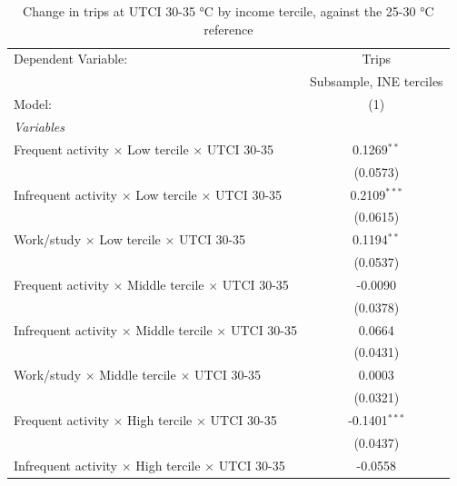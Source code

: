 
\begin{table}[htbp]
   \caption{\label{table_model_d_30-35} Change in trips at UTCI 30-35 °C by income tercile, against the 25-30 °C reference}
   \centering
   \small
   \begin{tabular}{lc}
      \tabularnewline \midrule \midrule
      Dependent Variable:                                               & Trips\\  
                                                                        & Subsample, INE terciles \\   
      Model:                                                            & (1)\\  
      \midrule
      \emph{Variables}\\
      Frequent activity $\times$ Low tercile $\times$ UTCI 30-35        & 0.1269$^{**}$\\   
                                                                        & (0.0573)\\   
      Infrequent activity $\times$ Low tercile $\times$ UTCI 30-35      & 0.2109$^{***}$\\   
                                                                        & (0.0615)\\   
      Work/study $\times$ Low tercile $\times$ UTCI 30-35               & 0.1194$^{**}$\\   
                                                                        & (0.0537)\\   
      Frequent activity $\times$ Middle tercile $\times$ UTCI 30-35     & -0.0090\\   
                                                                        & (0.0378)\\   
      Infrequent activity $\times$ Middle tercile $\times$ UTCI 30-35   & 0.0664\\   
                                                                        & (0.0431)\\   
      Work/study $\times$ Middle tercile $\times$ UTCI 30-35            & 0.0003\\   
                                                                        & (0.0321)\\   
      Frequent activity $\times$ High tercile $\times$ UTCI 30-35       & -0.1401$^{***}$\\   
                                                                        & (0.0437)\\   
      Infrequent activity $\times$ High tercile $\times$ UTCI 30-35     & -0.0558\\   

\end{tabular}
\end{table}
